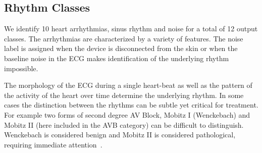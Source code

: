 \subsection{Rhythm Classes}

We identify 10 heart arrhythmias, sinus rhythm and noise for a total of 12
output classes. The arrhythmias are characterized by a variety of features.
The noise label is assigned when the device is disconnected from the skin or
when the baseline noise in the ECG makes identification of the underlying
rhythm impossible.

The morphology of the ECG during a single heart-beat as well as the pattern of
the activity of the heart over time determine the underlying rhythm. In some
cases the distinction between the rhythms can be subtle yet critical for
treatment. For example two forms of second degree AV Block, Mobitz I
(Wenckebach) and Mobitz II (here included in the AVB category) can be difficult to
distinguish. Wenckebach is considered benign and Mobitz II is considered
pathological, requiring immediate attention~\cite{dubin1996rapid}. 
